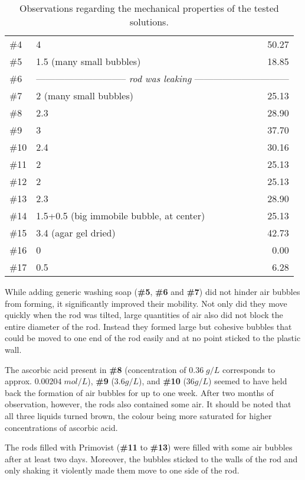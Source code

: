 \begin{table}[]
\begin{tabular}{l|lr}
\#4   & 4					& 50.27				\\
\#5   & 1.5 (many small bubbles)		& 18.85				\\
\#6   & \multicolumn{2}{c}{-----------------------------\textit{ rod was leaking }------------------------------}\\
\#7   & 2 (many small bubbles)			& 25.13				\\
\#8   & 2.3					& 28.90				\\
\#9   & 3					& 37.70				\\
\#10  & 2.4					& 30.16				\\
\#11  & 2					& 25.13				\\
\#12  & 2					& 25.13				\\
\#13  & 2.3					& 28.90				\\
\#14  & 1.5+0.5 (big immobile bubble, at center)	& 25.13				\\
\#15  & 3.4 (agar gel dried)			& 42.73				\\
\#16  & 0					& 0.00				\\
\#17  & 0.5					& 6.28				\\
\bottomrule
\end{tabular}
\caption{Observations regarding the mechanical properties of the tested solutions.}
\label{tab:bubbles}
\end{table}


While adding generic washing soap (\textbf{\#5}, \textbf{\#6} and \textbf{\#7}) did not hinder air bubbles from forming, it significantly improved their mobility.
Not only did they move quickly when the rod was tilted, large quantities of air also did not block the entire diameter of the rod.
Instead they formed large but cohesive bubbles that could be moved to one end of the rod easily and at no point sticked to the plastic wall.

The ascorbic acid present in \textbf{\#8} (concentration of $0.36 \; g/L$ corresponds to approx. $0.00204 \; mol/L$), \textbf{\#9} ($3.6 g/L$), and \textbf{\#10} ($36 g/L$) seemed to have held back the formation of air bubbles for up to one week.
After two months of observation, however, the rods also contained some air.
It should be noted that all three liquids turned brown, the colour being more saturated for higher concentrations of ascorbic acid.

The rods filled with Primovist (\textbf{\#11} to \textbf{\#13}) were filled with some air bubbles after at least two days.
Moreover, the bubbles sticked to the walls of the rod and only shaking it violently made them move to one side of the rod.

